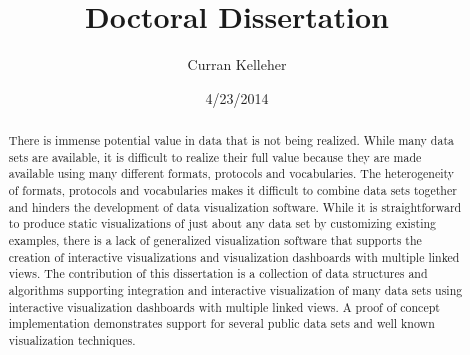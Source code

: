 \documentclass[12pt]{report}
\title{Doctoral Dissertation}
\author{Curran Kelleher}
\date{4/23/2014}
\begin{document}
\maketitle 

\begin{onehalfspacing}
\begin{abstract}
There is immense potential value in data that is not being realized. While many data sets are available, it is difficult to realize their full value because they are made available using many different formats, protocols and vocabularies. The heterogeneity of formats, protocols and vocabularies makes it difficult to combine data sets together and hinders the development of data visualization software. While it is straightforward to produce static visualizations of just about any data set by customizing existing examples, there is a lack of generalized visualization software that supports the creation of interactive visualizations and visualization dashboards with multiple linked views. The contribution of this dissertation is a collection of data structures and algorithms supporting integration and interactive visualization of many data sets using interactive visualization dashboards with multiple linked views. A proof of concept implementation demonstrates support for several public data sets and well known visualization techniques.
\end{abstract}
\end{onehalfspacing}

\pagebreak

\tableofcontents

\pagebreak
\end{document}
